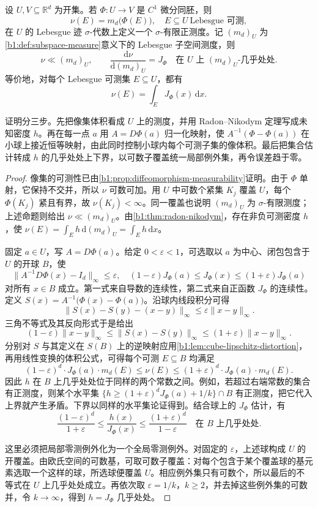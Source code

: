 \begin{theorem}\label{b1:thm:diffeomorphism-volume-density}
设 \(U,V\subseteq\mathbb R^d\) 为开集。若 \(\Phi:U\rightarrow V\) 是 \(C^1\) 微分同胚，则
\[
\nu(E)=m_d\bigl(\Phi(E)\bigr),\quad E\subseteq U\ \text{Lebesgue 可测},
\]
在 \(U\) 的 Lebesgue 迹 \(\sigma\)-代数上定义一个 \(\sigma\)-有限正测度。记 \((m_d)_U\) 为\cref{b1:def:subspace-measure}意义下的 Lebesgue 子空间测度，则
\[
\nu\ll(m_d)_U,
\qquad
\frac{\mathrm d\nu}{\mathrm d(m_d)_U}=J_\Phi
\quad\text{在 }U\text{ 上 }(m_d)_U\text{-几乎处处}.
\]
等价地，对每个 Lebesgue 可测集 \(E\subseteq U\)，都有
\[
\nu(E)=\int_E J_\Phi(x)\,\mathrm{d}x.
\]
\end{theorem}

证明分三步。先把像集体积看成 \(U\) 上的测度，并用 Radon--Nikodym 定理写成未知密度 \(h\)。再在每一点 \(a\) 用 \(A=D\Phi(a)\) 归一化映射，使 \(A^{-1}(\Phi-\Phi(a))\) 在小球上接近恒等映射，由此同时控制小球内每个可测子集的像体积。最后把集合估计转成 \(h\) 的几乎处处上下界，以可数子覆盖统一局部例外集，再令误差趋于零。

\begin{proof}
像集的可测性已由\cref{b1:prop:diffeomorphism-measurability}证明。由于 \(\Phi\) 单射，它保持不交并，所以 \(\nu\) 可数可加。用 \(U\) 中可数个紧集 \(K_j\) 覆盖 \(U\)，每个 \(\Phi(K_j)\) 紧且有界，故 \(\nu(K_j)<\infty\)。同一覆盖也说明 \((m_d)_U\) 为 \(\sigma\)-有限测度；上述命题则给出 \(\nu\ll(m_d)_U\)。由\cref{b1:thm:radon-nikodym}，存在非负可测密度 \(h\)，使
\(\nu(E)=\int_Eh\,\mathrm d(m_d)_U=\int_Eh\,\mathrm{d}x\)。

固定 \(a\in U\)，写 \(A=D\Phi(a)\)。给定 \(0<\varepsilon<1\)，可选取以 \(a\) 为中心、闭包包含于 \(U\) 的开球 \(B\)，使
\[
\|A^{-1}D\Phi(x)-I_d\|_\infty\leq\varepsilon,
\quad
(1-\varepsilon)J_\Phi(a)\leq J_\Phi(x)
\leq(1+\varepsilon)J_\Phi(a)
\]
对所有 \(x\in B\) 成立。第一式来自导数的连续性，第二式来自正函数 \(J_\Phi\) 的连续性。定义
\(S(x)=A^{-1}\bigl(\Phi(x)-\Phi(a)\bigr)\)。沿球内线段积分可得
\[
\|S(x)-S(y)-(x-y)\|_\infty
\leq\varepsilon\|x-y\|_\infty.
\]
三角不等式及其反向形式于是给出
\[
(1-\varepsilon)\|x-y\|_\infty
\leq\|S(x)-S(y)\|_\infty
\leq(1+\varepsilon)\|x-y\|_\infty.
\]
分别对 \(S\) 与其定义在 \(S(B)\) 上的逆映射应用\cref{b1:lem:cube-lipschitz-distortion}，再用线性变换的体积公式，可得每个可测 \(E\subseteq B\) 均满足
\[
(1-\varepsilon)^d\cdot J_\Phi(a)\cdot m_d(E)
\leq\nu(E)
\leq(1+\varepsilon)^d\cdot J_\Phi(a)\cdot m_d(E).
\]
因此 \(h\) 在 \(B\) 上几乎处处位于同样的两个常数之间。例如，若超过右端常数的集合有正测度，则某个水平集
\(\{h\geq(1+\varepsilon)^dJ_\Phi(a)+1/k\}\cap B\)
有正测度，把它代入上界就产生矛盾。下界以同样的水平集论证得到。结合球上的 \(J_\Phi\) 估计，有
\[
\frac{(1-\varepsilon)^d}{1+\varepsilon}
\leq\frac{h(x)}{J_\Phi(x)}
\leq\frac{(1+\varepsilon)^d}{1-\varepsilon}
\quad\text{在 }B\text{ 上几乎处处}.
\]

这里必须把局部零测例外化为一个全局零测例外。对固定的 \(\varepsilon\)，上述球构成 \(U\) 的开覆盖。由欧氏空间的可数基，可取可数子覆盖：对每个包含于某个覆盖球的基元素选取一个这样的球，所选球便覆盖 \(U\)。相应例外集只有可数个，所以最后的不等式在 \(U\) 上几乎处处成立。再依次取 \(\varepsilon=1/k\)，\(k\geq2\)，并去掉这些例外集的可数并，令 \(k\to\infty\)，得到 \(h=J_\Phi\) 几乎处处。
\end{proof}


